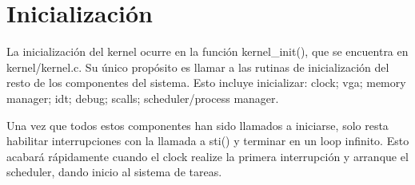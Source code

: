\section{Inicialización}

La inicialización del kernel ocurre en la función kernel\_init(), que se
encuentra en kernel/kernel.c. Su único propósito es llamar a las rutinas de
inicialización del resto de los componentes del sistema. Esto incluye
inicializar: clock; vga; memory manager; idt; debug; scalls; scheduler/process
manager.

Una vez que todos estos componentes han sido llamados a iniciarse, solo resta
habilitar interrupciones con la llamada a sti() y terminar en un loop infinito.
Esto acabará rápidamente cuando el clock realize la primera interrupción y
arranque el scheduler, dando inicio al sistema de tareas.
